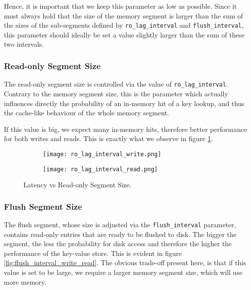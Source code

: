 Hence, it is important that we keep this parameter as low as possible. Since it must always hold that the size of the memory segment is larger than the sum of the sizes of the sub-segments defined by \verb"ro_lag_interval" and \verb"flush_interval", this parameter should ideally be set a value slightly larger than the sum of these two intervals.

\subsubsection{Read-only Segment Size}

The read-only segment size is controlled via the value of \verb"ro_lag_interval". Contrary to the memory segment size, this is the parameter which actually influences directly the probability of an in-memory hit of a key lookup, and thus the cache-like behaviour of the whole memory segment.

If this value is big, we expect many in-memory hits, therefore better performance for both writes and reads. This is exactly what we observe in figure \ref{fig:ro_lag_interval}.

\begin{figure}[h]
    \begin{subfigure}{.5\textwidth}
        \centering
        \texttt{[image: ro\_lag\_interval\_write.png]}
    \end{subfigure}
    \begin{subfigure}{.5\textwidth}
        \centering
        \texttt{[image: ro\_lag\_interval\_read.png]}
    \end{subfigure}
    \caption{Latency vs Read-only Segment Size.}
    \label{fig:ro_lag_interval}
\end{figure}

\subsubsection{Flush Segment Size}

The flush segment, whose size is adjusted via the \verb"flush_interval" parameter, contains read-only entries that are ready to be flushed to disk. The bigger the segment, the less the probability for disk access and therefore the higher the performance of the key-value store. This is evident in figure \ref{fig:flush_interval_write_read}. The obvious trade-off present here, is that if this value is set to be large, we require a larger memory segment size, which will use more memory.


